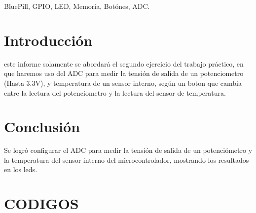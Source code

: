 \documentclass{plantilla}
\begin{document}
\maketitle

\begin{abstract}
En este informe se abordará el desarrollo del trabajo práctico Nro 2 ej. 2, en el cual experimentaremos el conversor Analogo-Digital de la placa BluePill. Se desarrollará el segundo ejercicio del trabajo práctico.
\end{abstract}

\begin{IEEEkeywords}
BluePill, GPIO, LED, Memoria, Botónes, ADC.
\end{IEEEkeywords}

\section{Introducción}
 este informe solamente se abordará el segundo ejercicio del trabajo práctico, en que haremos uso del ADC para medir la tensión de salida de un potenciometro (Hasta 3.3V), y temperatura de un sensor interno, según un boton que cambia entre la lectura del potenciometro y la lectura del sensor de temperatura.



\section{Conclusión}
Se logró configurar el ADC para medir la tensión de salida de un potenciómetro y la temperatura del sensor interno del microcontrolador, mostrando los resultados en los leds.
\newpage
\section{CODIGOS}


\end{document}
